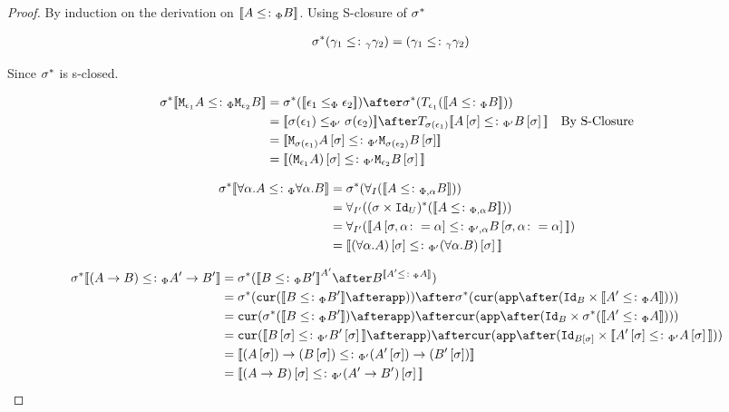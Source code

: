 \documentclass{report}
\begin{document}
\begin{framed}
    \begin{proof}
        
        By induction on the derivation on ${\bf [\![}A\leq\colon_\Phi B{\bf ]\!]}$. Using S-closure of $\sigma^*$ 
        
        \begin{align*}
            \sigma^*(\gamma_1\leq\colon_\gamma\gamma_2) &= (\gamma_1\leq\colon_\gamma\gamma_2)
        \end{align*}
        
        Since $\sigma^*$ is s-closed.
        
        \begin{align*}
            \si\star\deno{\M{\e_1}{A} \subtypep \M{\e_2}{B}} & = \si\star(\deno{\e_1\subeffectp\e_2})\after\si\star(\T{\e_1}(\deno{A\subtypep B})) \\ 
             &= \deno{\si(\e_1)\subeffectpp\si(\e_2)} \after \T{\si(\e_1)}{\deno{A\ssi\subtypepp B\ssi}}\qt{By S-Closure}\\
             &= \deno{\M{\si(\e_1)}{A\ssi}\subtypepp\M{\si(\e_2)}{B\ssi}}\\
             &= \deno{(\M{\e_1}{A})\ssi\subtypepp\M{\e_2}{B}\ssi}\\
        \end{align*}
        
            \begin{align*}
                \si\star\deno{\all{\a}{A}\subtypep\all{\a}{B}} &= \si\star(\allI(\deno{A\subtypepa B})) \\
                &=\allII((\si\times\Id{U})\star(\deno{A\subtypepa B}))\\
                &=\allII(\deno{A\sub{\si,\a\setto\a}\subtypeppa B\sub{\si,\a\setto\a}})\\
                &= \deno{(\all{\a}{A})\ssi \subtypepp(\all{\a}{B})\ssi}\\
            \end{align*}
        
        \begin{align*}
            \si\star\deno{(\ab)\subtypep\fntype{A'}{B'}} &= \si\star(\deno{B\subtypep B'}^{A'}\after B^{\deno{A'\subtypep A}})\\
            &= \si\star(\cur{\deno{B\subtypep B'}\after\app})\after\si\star(\cur{\app\after(\Id{B}\times\deno{A'\subtypep A})})\\
            & = \cur{\si\star(\deno{B\subtypep B'})\after\app}\after\cur{\app\after(\Id{B}\times\si\star(\deno{A'\subtypep A}))}\\
            & = \cur{\deno{B\ssi\subtypepp B'\ssi}\after\app}\after\cur{\app\after(\Id{B\ssi}\times\deno{A'\ssi\subtypepp A\ssi})}\\
            &= \deno{\fntype{(A\ssi)}{(B\ssi)}\subtypepp\fntype{(A'\ssi)}{(B'\ssi)}}\\
            &= \deno{(\ab)\ssi\subtypepp(\fntype{A'}{B'})\ssi}
        \end{align*}
    \end{proof}
\end{framed}
\end{document}
